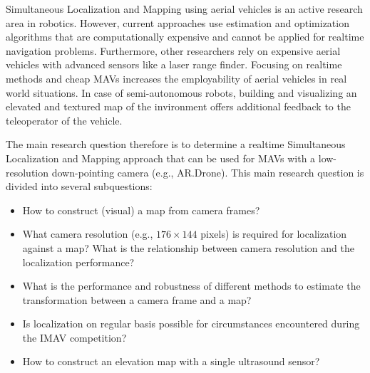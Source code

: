 Simultaneous Localization and Mapping using aerial vehicles is an active research area in robotics.
However, current approaches use estimation and optimization algorithms that are computationally expensive and cannot be applied for realtime navigation problems.
Furthermore, other researchers rely on expensive aerial vehicles
with advanced sensors like a laser range finder.
Focusing on realtime methods and cheap MAVs increases the employability of aerial vehicles in real world situations.
In case of semi-autonomous robots, building and visualizing an elevated and textured map of the invironment offers additional feedback to the teleoperator of the vehicle.

The main research question therefore is to determine a realtime Simultaneous Localization and Mapping approach that can be used for MAVs with a low-resolution down-pointing camera (e.g., AR.Drone).
This main research question is divided into several subquestions:
\begin{itemize}
\item How to construct (visual) a map from camera frames?
\item What camera resolution (e.g., $176 \times 144$ pixels) is required for localization against a map? What is the relationship between camera resolution and the localization performance?
\item What is the performance and robustness of different methods to estimate the transformation between a camera frame and a map?
\item Is localization on regular basis possible for circumstances encountered during the IMAV competition?
\item How to construct an elevation map with a single ultrasound sensor?
\end{itemize}

